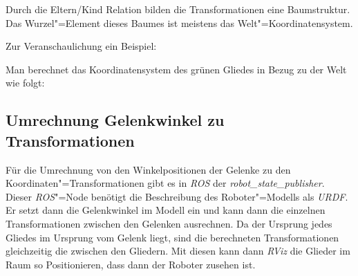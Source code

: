 Durch die Eltern/Kind Relation bilden die Transformationen eine Baumstruktur.
Das Wurzel"=Element dieses Baumes ist meistens das Welt"=Koordinatensystem.


Zur Veranschaulichung ein Beispiel:


Man berechnet das Koordinatensystem des grünen Gliedes in Bezug zu der Welt wie folgt:


\subsection{Umrechnung Gelenkwinkel zu Transformationen}
Für die Umrechnung von den Winkelpositionen der Gelenke zu den Koordinaten"=Transformationen gibt es in \textit{ROS} der \textit{robot\_state\_publisher}.
Dieser \textit{ROS}"=Node benötigt die Beschreibung des Roboter"=Modells als \textit{URDF}.
Er setzt dann die Gelenkwinkel im Modell ein und kann dann die einzelnen Transformationen zwischen den Gelenken ausrechnen.
Da der Ursprung jedes Gliedes im Ursprung vom Gelenk liegt, sind die berechneten Transformationen gleichzeitig die zwischen den Gliedern.
Mit diesen kann dann \textit{RViz} die Glieder im Raum so Positionieren, dass dann der Roboter zusehen ist.






